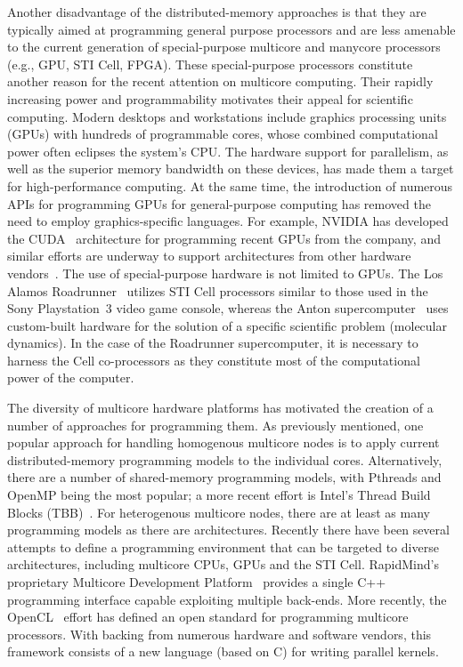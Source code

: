 \documentclass[10pt,conference,letterpaper]{IEEEtran}
\begin{document}
Another disadvantage of the distributed-memory approaches is that they are typically aimed at programming general purpose processors and are less amenable to the current generation of special-purpose multicore and manycore processors (e.g., GPU, STI Cell, FPGA). These special-purpose processors constitute another reason for the recent attention on multicore computing. Their rapidly increasing power and programmability motivates their appeal for scientific computing. Modern desktops and workstations include graphics processing units (GPUs) with hundreds of programmable cores, whose combined computational power often eclipses the system's CPU. The hardware support for parallelism, as well as the superior memory bandwidth on these devices, has made them a target for high-performance computing. At the same time, the introduction of numerous APIs for programming GPUs for general-purpose computing has removed the need to employ graphics-specific languages. For example, NVIDIA has developed the CUDA~\cite{CUDA} architecture for programming recent GPUs from the company, and similar efforts are underway to support architectures from other hardware vendors~\cite{AMDStream,BrookGPU}. The use of special-purpose hardware is not limited to GPUs. The Los Alamos Roadrunner~\cite{Roadrunner} utilizes STI Cell processors similar to those used in the Sony Playstation~3 video game console, whereas the Anton supercomputer~\cite{Anton} uses custom-built hardware for the solution of a specific scientific problem (molecular dynamics). In the case of the Roadrunner supercomputer, it is necessary to harness the Cell co-processors as they constitute most of the computational power of the computer.

The diversity of multicore hardware platforms has motivated the creation of a number of approaches for programming them. As previously mentioned, one popular approach for handling homogenous multicore nodes is to apply current distributed-memory programming models to the individual cores. Alternatively, there are a number of shared-memory programming models, with Pthreads and OpenMP being the most popular; a more recent effort is Intel's Thread Build Blocks (TBB)~\cite{TBB}. For heterogenous multicore nodes, there are at least as many programming models as there are architectures. Recently there have been several attempts to define a programming environment that can be targeted to diverse architectures, including multicore CPUs, GPUs and the STI Cell. RapidMind's proprietary Multicore Development Platform~\cite{RapidMind} provides a single C++ programming interface capable exploiting multiple back-ends. More recently, the OpenCL~\cite{OpenCL} effort has defined an open standard for programming multicore processors. With backing from numerous hardware and software vendors, this framework consists of a new language (based on C) for writing parallel kernels.
\end{document}

